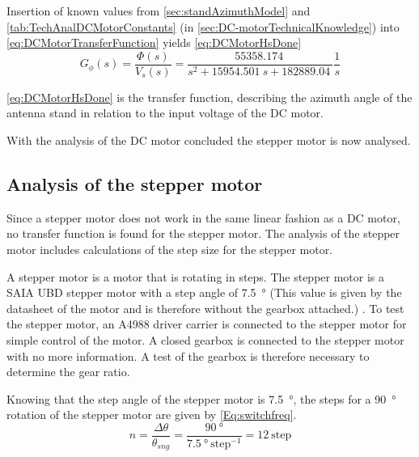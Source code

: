 Insertion of known values from \autoref{sec:standAzimuthModel} and \autoref{tab:TechAnalDCMotorConstants} (in \autoref{sec:DC-motorTechnicalKnowledge}) into \autoref{eq:DCMotorTransferFunction} yields \autoref{eq:DCMotorHsDone}
\begin{equation} 
G_\phi (s)=\frac{\Phi (s)}{V_s(s)}=\frac{\SI{55358.174}{}}{s^2+ \SI{15954.501}{} s +\SI{182889.04}{}} \frac{1}{s}\label{eq:DCMotorHsDone}
\end{equation}

\autoref{eq:DCMotorHsDone} is the transfer function, describing the azimuth angle of the antenna stand in relation to the input voltage of the DC motor. 


With the analysis of the DC motor concluded the stepper motor is now analysed. 

\subsection{Analysis of the stepper motor}\label{sec:techAnalAnalOfStepMotor}
Since a stepper motor does not work in the same linear fashion as a DC motor, no transfer function is found for the stepper motor. The analysis of the stepper motor includes calculations of the step size for the stepper motor.

A stepper motor is a motor that is rotating in steps. The stepper motor is a SAIA UBD stepper motor with a step angle of \SI{7.5}{\degree} (This value is given by the datasheet of the motor and is therefore without the gearbox attached.) \citep{SAIAstep}. To test the stepper motor, an A4988 driver carrier is connected to the stepper motor for simple control of the motor. 
A closed gearbox is connected to the stepper motor with no more information. A test of the gearbox is therefore necessary to determine the gear ratio. 

Knowing that the step angle of the stepper motor is \SI{7.5}{\degree}, the steps for a \SI{90}{\degree} rotation of the stepper motor are given by \autoref{Eq:switchfreq}.
\begin{equation}\label{Eq:switchfreq}
n=\frac{\Delta\theta}{\theta_{sng}} = \frac{\SI{90}{\degree}}{\SI{7.5}{\degree}~\text{step}^{-1}} = 12~\text{step}
\end{equation}
\startexplain
{}
\stopexplain


